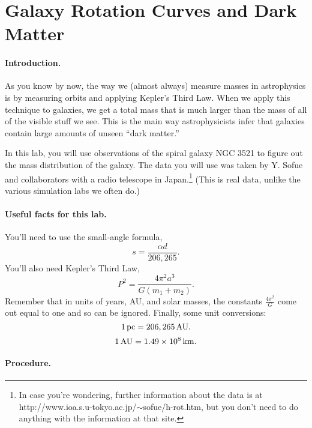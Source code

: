 \section{Galaxy Rotation Curves and Dark Matter}

\makelabheader

\paragraph{Introduction.}

As you know by now, the way we (almost always) measure masses
in astrophysics is by measuring orbits and applying Kepler's Third
Law.  When we apply this technique to galaxies, we get a total
mass that is much larger than the mass of all of the visible
stuff we see.  This is the main way astrophysicists infer that
galaxies contain large amounts of unseen ``dark matter.''

In this lab, you will use observations of the spiral
galaxy NGC 3521 to figure out the mass distribution of the galaxy.
The data you will use was taken by Y. Sofue and collaborators
with a radio telescope in Japan.\footnote{In case you're
wondering, further information about the data is at
http://www.ioa.s.u-tokyo.ac.jp/$\sim$sofue/h-rot.htm,  but you don't
need to do anything with the information at that site.}
(This is real data, unlike
the various simulation labs we often do.)  

\paragraph{Useful facts for this lab.}

You'll need to use the small-angle formula,
$$
s=\frac{\alpha d}{206,265}.
$$
You'll also need Kepler's Third Law,
$$
P^2=\frac{4\pi^2a^3}{G(m_1+m_2)}.
$$
Remember that in units of years, AU, and solar masses, the
constants $\frac{4\pi^2}{G}$ come out equal to one and so can
be ignored.  Finally, some unit conversions:
$$
1\,{\rm pc}=206,265\,{\rm AU}.
$$
$$
1\,{\rm AU}=1.49\times 10^8\,{\rm km}.
$$


\paragraph{Procedure.}

